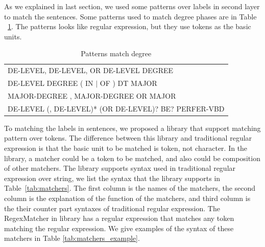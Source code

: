 As we explained in last section, we used some patterns over labels in second layer to match the sentences. Some patterns used to match degree phases are in Table ~\ref{tab:patterns}. The patterns looks like regular expression, but they use tokens as the basic units.

\begin{table}[ht]
\small
\caption{Patterns match degree} %
\centering %
\begin{tabular}{  | l  |  }
 \hline
 DE-LEVEL,  DE-LEVEL, OR  DE-LEVEL DEGREE   \\
 DE-LEVEL DEGREE ( IN  $\vert$  OF ) DT MAJOR   \\
 MAJOR-DEGREE  ,  MAJOR-DEGREE OR MAJOR \\
 DE-LEVEL (, DE-LEVEL)* (OR DE-LEVEL)? BE? PERFER-VBD   \\
 \hline
\end{tabular}
\label{tab:patterns} %
\end{table}

To matching the labels in sentences, we proposed a library that support matching pattern over tokens. The difference between this library and traditional regular expression is that the basic unit to be matched is token, not character. In the library, a matcher could be a token to be matched, and also could be composition of other matchers. The library supports syntax used in traditional regular expression over string, we list the syntax that the library supports in Table~\ref{tab:matchers}. The first column is the names of the matchers, the second column is the explanation of the function of the matchers, and third column is the their counter part syntaxes of traditional regular expression. The RegexMatcher in library has a regular expression that matches any token matching the regular expression. We give examples of the syntax of these matchers in Table \ref{tab:matchers_example}.

